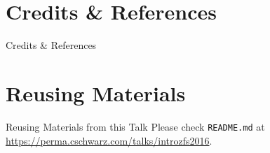 \documentclass[aspectratio=1610]{beamer}
\begin{document}
\section{Credits \& References}
\begin{frame}[allowframebreaks]{Credits \& References}
	\nocite{*}
	
	
\end{frame}

\section{Reusing Materials}
\begin{frame}[allowframebreaks]{Reusing Materials from this Talk}
\centering
Please check \texttt{README.md} at \url{https://perma.cschwarz.com/talks/introzfs2016}.
\end{frame}
\end{document}
